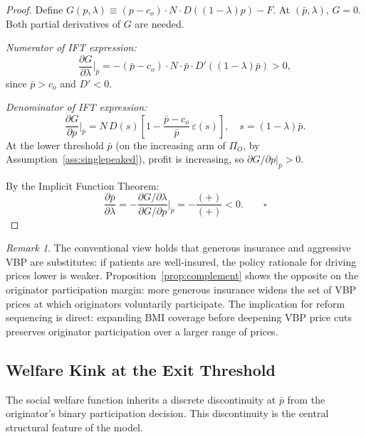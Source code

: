 \documentclass[12pt]{article}
\theoremstyle{plain}
\theoremstyle{definition}
\theoremstyle{remark}
\newtheorem{remark}{Remark}
\newcommand{\pbar}{\bar{p}}
\newcommand{\1}{\mathbf{1}}
\begin{document}
\begin{proof}
Define $G(p,\lambda) \equiv (p-c_o)\cdot N \cdot D((1-\lambda)p) - F$. At $(\pbar, \lambda)$, $G = 0$. Both partial derivatives of $G$ are needed.

\emph{Numerator of IFT expression:}
$$\frac{\partial G}{\partial\lambda}\bigg|_{\pbar} = -(\pbar - c_o)\cdot N \cdot \pbar \cdot D'((1-\lambda)\pbar) > 0,$$
since $\pbar > c_o$ and $D' < 0$.

\emph{Denominator of IFT expression:}
$$\frac{\partial G}{\partial p}\bigg|_{\pbar} = N\,D(s)\!\left[1 - \frac{\pbar - c_o}{\pbar}\,\varepsilon(s)\right], \quad s = (1-\lambda)\pbar.$$
At the lower threshold $\pbar$ (on the increasing arm of $\Pi_O$, by Assumption~\ref{ass:singlepeaked}), profit is increasing, so $\partial G/\partial p|_{\pbar} > 0$.

By the Implicit Function Theorem:
$$\frac{\partial\pbar}{\partial\lambda} = -\frac{\partial G/\partial\lambda}{\partial G/\partial p}\bigg|_{\pbar} = -\frac{(+)}{(+)} < 0. \qquad \square$$
\end{proof}

\begin{remark}
The conventional view holds that generous insurance and aggressive VBP are substitutes: if patients are well-insured, the policy rationale for driving prices lower is weaker. Proposition~\ref{prop:complement} shows the opposite on the originator participation margin: more generous insurance widens the set of VBP prices at which originators voluntarily participate. The implication for reform sequencing is direct: expanding BMI coverage before deepening VBP price cuts preserves originator participation over a larger range of prices.
\end{remark}

\subsection{Welfare Kink at the Exit Threshold}

The social welfare function inherits a discrete discontinuity at $\pbar$ from the originator's binary participation decision. This discontinuity is the central structural feature of the model.
\end{document}
